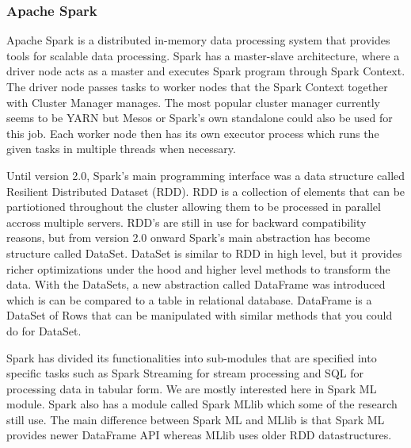 \subsubsection{Apache Spark}

Apache Spark is a distributed in-memory data processing system that provides tools for scalable data processing.
Spark has a master-slave architecture, where a driver node acts as a master and executes Spark program through Spark Context.
The driver node passes tasks to worker nodes that the Spark Context together with Cluster Manager manages.
The most popular cluster manager currently seems to be YARN but Mesos or Spark's own standalone could also be used for this job. 
Each worker node then has its own executor process which runs the given tasks in multiple threads when necessary.\cite{spark}

Until version 2.0, Spark's main programming interface was a data structure called Resilient Distributed Dataset (RDD).
RDD is a collection of elements that can be partiotioned throughout the cluster allowing them to be processed in parallel accross multiple servers.
RDD's are still in use for backward compatibility reasons, but from version 2.0 onward Spark's main abstraction has become structure called DataSet.
DataSet is similar to RDD in high level, but it provides richer optimizations under the hood and higher level methods to transform the data.
With the DataSets, a new abstraction called DataFrame was introduced which is can be compared to a table in relational database.
DataFrame is a DataSet of Rows that can be manipulated with similar methods that you could do for DataSet.\cite{spark}

Spark has divided its functionalities into sub-modules that are specified into specific tasks such as Spark Streaming for stream processing and SQL for processing data in tabular form.
We are mostly interested here in Spark ML module.
Spark also has a module called Spark MLlib which some of the research still use.
The main difference between Spark ML and MLlib is that Spark ML provides newer DataFrame API whereas MLlib uses older RDD datastructures.\cite{amirghodsi}


